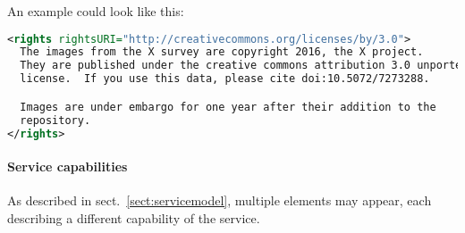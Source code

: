 \documentclass[11pt,a4paper]{ivoa}
\begin{document}

An example could look like this:

\begin{lstlisting}[language=XML,basicstyle=\footnotesize]
<rights rightsURI="http://creativecommons.org/licenses/by/3.0">
  The images from the X survey are copyright 2016, the X project.
  They are published under the creative commons attribution 3.0 unported
  license.  If you use this data, please cite doi:10.5072/7273288.

  Images are under embargo for one year after their addition to the
  repository.
</rights>
\end{lstlisting}

\paragraph{Service capabilities}

As described in sect.~\ref{sect:servicemodel}, multiple
 elements may appear, each describing a
different capability of the service.  
\end{document}
